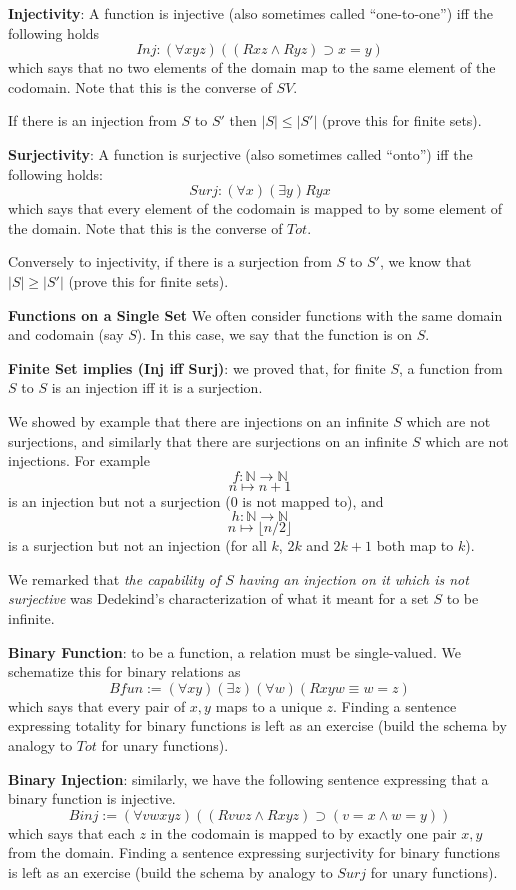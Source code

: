 \begin{mdframed}[linewidth=1]
\textbf{Injectivity}: A function is injective (also sometimes called ``one-to-one'') iff the following holds
\[
    Inj: (\forall xyz)((Rxz \land Ryz) \supset x = y) 
\]
which says that no two elements of the domain map to the same element of the codomain. Note that this is the converse of $SV$. 

If there is an injection from $S$ to $S'$ then $|S| \leq |S'|$ (prove this for finite sets). 

\textbf{Surjectivity}: A function is surjective (also sometimes called ``onto'') iff the following holds:
\[
    Surj: (\forall x)(\exists y)Ryx
\]
which says that every element of the codomain is mapped to by some element of the domain. Note that this is the converse of $Tot$. 

Conversely to injectivity, if there is a surjection from $S$ to $S'$, we know that $|S| \geq |S'|$ (prove this for finite sets). 

\textbf{Functions on a Single Set}
We often consider functions with the same domain and codomain (say $S$). In this case, we say that the function is on $S$. 

\textbf{Finite Set implies (Inj iff Surj)}: we proved that, for finite $S$, a function from $S$ to $S$ is an injection iff it is a surjection. 

We showed by example that there are injections on an infinite $S$ which are not surjections, and similarly that there are surjections on an infinite $S$ which are not injections. For example
\[
    f: \mathbb{N} \rightarrow \mathbb{N}
\]
\[
    n \mapsto n + 1
\]
is an injection but not a surjection (0 is not mapped to), and 
\[
    h: \mathbb{N} \rightarrow \mathbb{N}
\]
\[
    n \mapsto \lfloor n/2\rfloor
\]
is a surjection but not an injection (for all $k$, $2k$ and $2k + 1$ both map to $k$).

We remarked that \emph{the capability of $S$ having an injection on it which is not surjective} was Dedekind's characterization of what it meant for a set $S$ to be infinite. 

\textbf{Binary Function}: to be a function, a relation must be single-valued. We schematize this for binary relations as 
\[
    Bfun:= (\forall xy)(\exists z)(\forall w)(Rxyw \equiv w = z)
\]
which says that every pair of $x,y$ maps to a unique $z$. Finding a sentence expressing totality for binary functions is left as an exercise (build the schema by analogy to $Tot$ for unary functions). 

\textbf{Binary Injection}: similarly, we have the following sentence expressing that a binary function is injective. 
\[
    Binj:= (\forall vwxyz)((Rvwz \land Rxyz) \supset (v = x \land w = y))
\]
which says that each $z$ in the codomain is mapped to by exactly one pair $x, y$ from the domain. Finding a sentence expressing surjectivity for binary functions is left as an exercise (build the schema by analogy to $Surj$ for unary functions). 


\end{mdframed}
